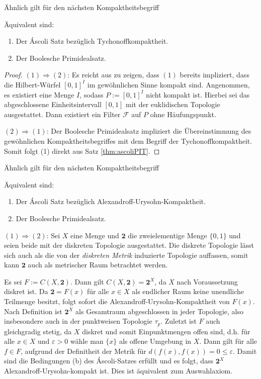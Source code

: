 Ähnlich gilt für den nächsten Kompaktheitsbegriff

\begin{thm}
  Äquivalent sind:
  \begin{enumerate}
    \item Der Áscoli Satz bezüglich Tychonoffkompaktheit.
    \item Der Boolesche Primidealsatz.
  \end{enumerate}
\end{thm}

\begin{proof}
  $(1)\Rightarrow(2) $: Es reicht aus zu zeigen, dass $(1)$ bereits impliziert, dass die Hilbert-Würfel $[0,1]^I$ im gewöhnlichen Sinne kompakt sind.
  Angenommen, es existiert eine Menge $I$, sodass $P:= [0,1]^I$ nicht kompakt ist.
  Hierbei sei das abgeschlossene Einheitsintervall $[0,1]$ mit der euklidischen Topologie ausgestattet.
  Dann existiert ein Filter $\mathcal{F}$ auf $P$ ohne Häufungspunkt.

  $(2)\Rightarrow(1)$: Der Boolesche Primidealsatz impliziert die Übereinstimmung des gewöhnlichen Kompaktheitsbegriffes mit dem Begriff der Tychonoffkompaktheit. Somit folgt (1) direkt aus Satz \ref{thm:ascoliPIT}.
\end{proof}


Ähnlich gilt für den nächsten Kompaktheitsbegriff

\begin{thm}
  Äquivalent sind:
  \begin{enumerate}
    \item Der Áscoli Satz bezüglich Alexandroff-Urysohn-Kompaktheit.
    \item Der Boolesche Primidealsatz.
  \end{enumerate}
\end{thm}

  $(1) \Rightarrow (2)$: Sei $X$ eine Menge und $\mathbf{2}$ die zweielementige Menge $\{0,1\}$ und seien beide mit der diskreten Topologie ausgestattet. 
  Die diskrete Topologie lässt sich auch als die von der \textit{diskreten Metrik} induzierte Topologie auffassen, somit kann $\mathbf{2}$ auch als metrischer Raum betrachtet werden. 

  Es sei $F := C(X, \mathbf{2})$.
  Dann gilt $C(X, \mathbf{2}) = \mathbf{2}^X$, da $X$ nach Voraussetzung diskret ist.
  Da $\mathbf{2} = F(x)$ für alle $x \in X$ als endlicher Raum keine unendliche Teilmenge besitzt, folgt sofort die Alexandroff-Urysohn-Kompaktheit von $F(x)$.
  Nach Definition ist $\mathbf{2}^X$ als Gesamtraum abgeschlossen in jeder Topologie, also insbesondere auch in der punktweisen Topologie $\tau_p$.
  Zuletzt ist $F$ auch gleichgradig stetig, da $X$ diskret und somit Einpunktmengen offen sind, d.h. für alle $x \in X$ und $\varepsilon > 0$ wähle man $\{x\}$ als offene Umgebung in $X$. Dann gilt für alle $f \in F$, aufgrund der Definitheit der Metrik für  $d(f(x),f(x)) = 0 \leq \varepsilon$.
  Damit sind die Bedingungen (b) des Áscoli-Satzes erfüllt und es folgt, dass $\mathbf{2}^X$ Alexandroff-Urysohn-kompakt ist. Dies ist äquivalent zum Auswahlaxiom.

